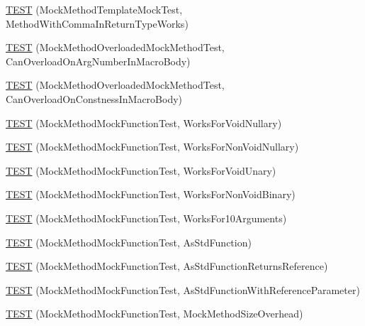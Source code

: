\begin{DoxyCompactItemize}
\item 
\mbox{\hyperlink{namespacetesting_1_1gmock__function__mocker__test_af3c7ad8b0cb50a8a40b72672b13826f7}{T\+E\+ST}} (Mock\+Method\+Template\+Mock\+Test, Method\+With\+Comma\+In\+Return\+Type\+Works)
\item 
\mbox{\hyperlink{namespacetesting_1_1gmock__function__mocker__test_ab1358739e5588f66cf39320e89464447}{T\+E\+ST}} (Mock\+Method\+Overloaded\+Mock\+Method\+Test, Can\+Overload\+On\+Arg\+Number\+In\+Macro\+Body)
\item 
\mbox{\hyperlink{namespacetesting_1_1gmock__function__mocker__test_ad88b0b208d03f3e5dee3a164ce33e39c}{T\+E\+ST}} (Mock\+Method\+Overloaded\+Mock\+Method\+Test, Can\+Overload\+On\+Constness\+In\+Macro\+Body)
\item 
\mbox{\hyperlink{namespacetesting_1_1gmock__function__mocker__test_ad889805da4cce67f2206590b750b27a2}{T\+E\+ST}} (Mock\+Method\+Mock\+Function\+Test, Works\+For\+Void\+Nullary)
\item 
\mbox{\hyperlink{namespacetesting_1_1gmock__function__mocker__test_ae2b01f0da84371fde518da4066b6a172}{T\+E\+ST}} (Mock\+Method\+Mock\+Function\+Test, Works\+For\+Non\+Void\+Nullary)
\item 
\mbox{\hyperlink{namespacetesting_1_1gmock__function__mocker__test_a2f1e932fb15621747f47d617efbe395e}{T\+E\+ST}} (Mock\+Method\+Mock\+Function\+Test, Works\+For\+Void\+Unary)
\item 
\mbox{\hyperlink{namespacetesting_1_1gmock__function__mocker__test_a31ed39f17667619d800693a7eb90682e}{T\+E\+ST}} (Mock\+Method\+Mock\+Function\+Test, Works\+For\+Non\+Void\+Binary)
\item 
\mbox{\hyperlink{namespacetesting_1_1gmock__function__mocker__test_a3396573237c21c4c397152bcfbb3beff}{T\+E\+ST}} (Mock\+Method\+Mock\+Function\+Test, Works\+For10\+Arguments)
\item 
\mbox{\hyperlink{namespacetesting_1_1gmock__function__mocker__test_aa50eb1403be35a710eb62edf606ee2a1}{T\+E\+ST}} (Mock\+Method\+Mock\+Function\+Test, As\+Std\+Function)
\item 
\mbox{\hyperlink{namespacetesting_1_1gmock__function__mocker__test_adc6133bd5a20d1a4690f626d09619cb2}{T\+E\+ST}} (Mock\+Method\+Mock\+Function\+Test, As\+Std\+Function\+Returns\+Reference)
\item 
\mbox{\hyperlink{namespacetesting_1_1gmock__function__mocker__test_af727b49c865283e3ef0209fac721cfd7}{T\+E\+ST}} (Mock\+Method\+Mock\+Function\+Test, As\+Std\+Function\+With\+Reference\+Parameter)
\item 
\mbox{\hyperlink{namespacetesting_1_1gmock__function__mocker__test_a5c28161d4686a85b0e5bf4a1f2b961f6}{T\+E\+ST}} (Mock\+Method\+Mock\+Function\+Test, Mock\+Method\+Size\+Overhead)
\end{DoxyCompactItemize}


